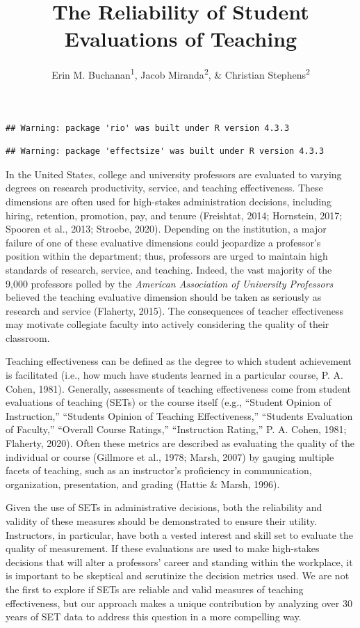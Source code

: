 \documentclass[
  man]{apa7}
\title{The Reliability of Student Evaluations of Teaching}
\author{Erin M. Buchanan\textsuperscript{1}, Jacob Miranda\textsuperscript{2}, \& Christian Stephens\textsuperscript{2}}
\date{}
\affiliation{\vspace{0.5cm}\textsuperscript{1} Harrisburg University of Science and Technology\\\textsuperscript{2} University of Alabama}
\begin{document}
\maketitle

\begin{verbatim}
## Warning: package 'rio' was built under R version 4.3.3
\end{verbatim}

\begin{verbatim}
## Warning: package 'effectsize' was built under R version 4.3.3
\end{verbatim}

In the United States, college and university professors are
evaluated to varying degrees on research productivity, service, and
teaching effectiveness. These dimensions are often used for high-stakes
administration decisions, including hiring, retention, promotion, pay,
and tenure (Freishtat, 2014; Hornstein, 2017; Spooren et al., 2013; Stroebe, 2020).
Depending on the institution, a major failure of one of these evaluative
dimensions could jeopardize a professor's position within the
department; thus, professors are urged to maintain high standards of
research, service, and teaching. Indeed, the vast majority of the 9,000
professors polled by the \emph{American Association of University Professors}
believed the teaching evaluative dimension should be taken as seriously
as research and service (Flaherty, 2015). The consequences of teacher
effectiveness may motivate collegiate faculty into actively considering
the quality of their classroom.

Teaching effectiveness can be defined as the degree to which student
achievement is facilitated (i.e., how much have students learned in a
particular course, P. A. Cohen, 1981). Generally, assessments of teaching
effectiveness come from student evaluations of teaching (SETs) or the
course itself (e.g., ``Student Opinion of Instruction,'' ``Students Opinion
of Teaching Effectiveness,'' ``Students Evaluation of Faculty,'' ``Overall
Course Ratings,'' ``Instruction Rating,'' P. A. Cohen, 1981; Flaherty, 2020). Often
these metrics are described as evaluating the quality of the individual
or course (Gillmore et al., 1978; Marsh, 2007) by gauging multiple facets of teaching, such as an instructor's proficiency in communication, organization, presentation, and grading (Hattie \& Marsh, 1996).

Given the use of SETs in administrative decisions, both the reliability and validity of these measures should be demonstrated to ensure their utility. Instructors, in particular, have both a vested interest and skill set to evaluate the quality of measurement. If these evaluations are used to make high-stakes decisions that will alter a professors' career and standing within the workplace, it is important to be skeptical and scrutinize the decision metrics used. We are not the first to explore if SETs are reliable and valid measures of teaching effectiveness, but our approach makes a unique contribution by analyzing over 30 years of SET data to address this question in a more compelling way.
\end{document}
